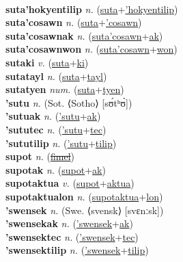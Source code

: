  \label{sutalon} \\
\textbf{suta'hokyentilip} \textit{n.} (\hyperref[suta]{suta}+\hyperref['hokyentilip]{'hokyentilip})
 \label{suta'hokyentilip} \\
\textbf{suta'cosawn} \textit{n.} (\hyperref[suta]{suta}+\hyperref['cosawn]{'cosawn})
 \label{suta'cosawn} \\
\textbf{suta'cosawnak} \textit{n.} (\hyperref[suta'cosawn]{suta'cosawn}+\hyperref[ak]{ak})
 \label{suta'cosawnak} \\
\textbf{suta'cosawnwon} \textit{n.} (\hyperref[suta'cosawn]{suta'cosawn}+\hyperref[won]{won})
 \label{suta'cosawnwon} \\
\textbf{sutaki} \textit{v.} (\hyperref[suta]{suta}+\hyperref[ki]{ki})
 \label{sutaki} \\
\textbf{sutatayl} \textit{n.} (\hyperref[suta]{suta}+\hyperref[tayl]{tayl})
 \label{sutatayl} \\
\textbf{sutatyen} \textit{num.} (\hyperref[suta]{suta}+\hyperref[tyen]{tyen})
 \label{sutatyen} \\
\textbf{'sutu} \textit{n.} (Sot. ⟨Sotho⟩ [sʊ́tʰʊ̀])
 \label{'sutu} \\
\textbf{'sutuak} \textit{n.} (\hyperref['sutu]{'sutu}+\hyperref[ak]{ak})
 \label{'sutuak} \\
\textbf{'sututec} \textit{n.} (\hyperref['sutu]{'sutu}+\hyperref[tec]{tec})
 \label{'sututec} \\
\textbf{'sututilip} \textit{n.} (\hyperref['sutu]{'sutu}+\hyperref[tilip]{tilip})
 \label{'sututilip} \\
\textbf{supot} \textit{n.} (\hyperref[fimel]{\sout{fimel}})
 \label{supot} \\
\textbf{supotak} \textit{n.} (\hyperref[supot]{supot}+\hyperref[ak]{ak})
 \label{supotak} \\
\textbf{supotaktua} \textit{v.} (\hyperref[supot]{supot}+\hyperref[aktua]{aktua})
 \label{supotaktua} \\
\textbf{supotaktualon} \textit{n.} (\hyperref[supotaktua]{supotaktua}+\hyperref[lon]{lon})
 \label{supotaktualon} \\
\textbf{'swensek} \textit{n.} (Swe. ⟨svensk⟩ [svɛnːsk])
 \label{'swensek} \\
\textbf{'swensekak} \textit{n.} (\hyperref['swensek]{'swensek}+\hyperref[ak]{ak})
 \label{'swensekak} \\
\textbf{'swensektec} \textit{n.} (\hyperref['swensek]{'swensek}+\hyperref[tec]{tec})
 \label{'swensektec} \\
\textbf{'swensektilip} \textit{n.} (\hyperref['swensek]{'swensek}+\hyperref[tilip]{tilip})
